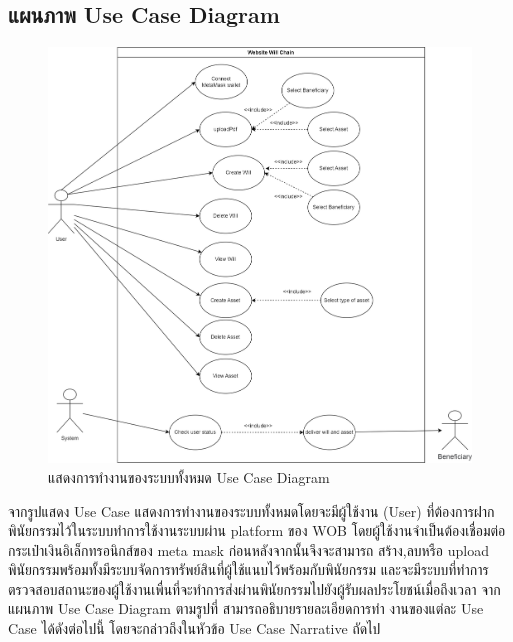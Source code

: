 \documentclass[12pt,oneside,openright,a4paper]{cpe-thai-project}
\begin{document}
\subsection{แผนภาพ Use Case Diagram}
	\begin{figure}[!htb]
		\centering
		\includegraphics[scale=0.2]{UseCaseDiagram}
		\caption{แสดงการทำงานของระบบทั้งหมด Use Case Diagram}
	\end{figure}
\FloatBarrier
\tab จากรูปแสดง Use Case แสดงการทำงานของระบบทั้งหมดโดยจะมีผู้ใช้งาน (User) ที่ต้องการฝากพินัยกรรมไว้ในระบบทำการใช้งานระบบผ่าน platform ของ WOB โดยผู้ใช้งานจำเป็นต้องเชื่อมต่อกระเป๋าเงินอิเล็กทรอนิกส์ของ meta mask ก่อนหลังจากนั้นจึงจะสามารถ สร้าง,ลบหรือ upload พินัยกรรมพร้อมทั้งมีระบบจัดการทรัพย์สินที่ผู้ใช้แนบไว้พร้อมกับพินัยกรรม และจะมีระบบที่ทำการตรวจสอบสถานะของผู้ใช้งานเพื่นที่จะทำการส่งผ่านพินัยกรรมไปยังผู้รับผลประโยชน์เมื่อถึงเวลา   จากแผนภาพ Use Case Diagram ตามรูปที่ สามารถอธิบายรายละเอียดการทํา งานของแต่ละ Use Case ได้ดังต่อไปนี้ โดยจะกล่าวถึงในหัวข้อ Use Case Narrative ถัดไป
\end{document}
